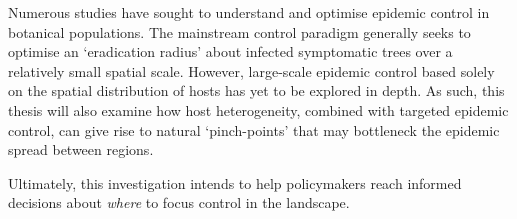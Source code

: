 Numerous studies have sought to understand and optimise epidemic control in botanical populations. 
The mainstream control paradigm generally seeks to optimise an `eradication radius' about infected symptomatic trees over a relatively small spatial scale. However, large-scale epidemic control based solely on the spatial distribution of hosts has yet to be explored in depth. 
As such, this thesis will also examine how host heterogeneity, combined with targeted epidemic control, can give rise to natural `pinch-points' that may bottleneck the epidemic spread between regions. 

Ultimately, this investigation intends to help policymakers reach informed decisions about \textit{where} to focus control in the landscape.



\newcommand{\RNum}[1]{\uppercase\expandafter{\romannumeral #1\relax}}
